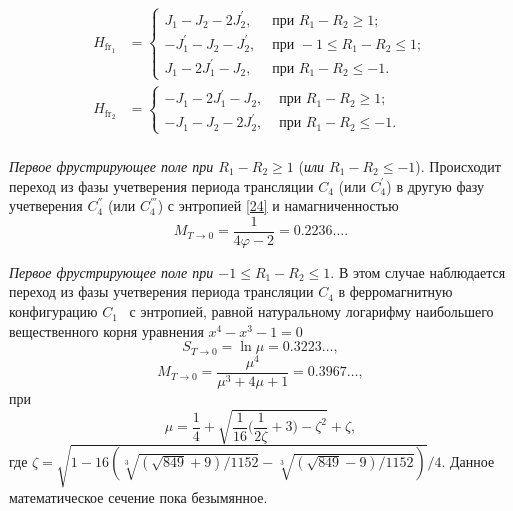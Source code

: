 \[
\begin{aligned}
H_{\text{fr}_1}&=
\begin{cases}
J_{1}-J_2-2J_{2}^{'}, & \text{ при } R_1-R_2\ge 1; \\
-J_{1}^{'}-J_2-J_{2}^{'}, & \text{ при } -1\leq R_1-R_2\leq 1; \\
J_1-2J_{1}^{'}-J_{2},   & \text{ при }  R_1-R_2\leq  -1.
\end{cases}\\
H_{\text{fr}_2}&=
\begin{cases}
-J_1-2J_1^{'}-J_2, & \text{ при } R_1-R_2\ge 1; \\
-J_1-J_2-2J_2^{'},   & \text{ при }  R_1-R_2\leq -1.
\end{cases}\\
\end{aligned}
\]


\emph{Первое фрустрирующее поле при $R_1 - R_2 \geqslant 1$} (\emph{или $R_1 - R_2 \leqslant -1$}). Происходит переход из фазы учетверения периода трансляции $C_4$ (или $C_4^{'}$) в другую фазу учетверения $C_4^{''}$ (или $C_4^{'''}$) с энтропией \eqref{24} и намагниченностью
\begin{equation}
M_{T\rightarrow 0} = \frac{1}{4\varphi - 2} = 0.2236\dots.
\label{34}
\end{equation}

\emph{Первое фрустрирующее поле при $-1 \leqslant R_1 - R_2 \leqslant 1$}. В этом случае наблюдается переход из фазы учетверения периода трансляции $C_4$ в ферромагнитную конфигурацию $C_1$~\cite{zarubin2019} с энтропией, равной натуральному логарифму наибольшего вещественного корня уравнения $x^4-x^3-1=0$
\begin{equation}
S_{T\rightarrow 0} = \ln \mu = 0.3223\dots,
\label{35}
\end{equation}
\begin{equation}
M_{T\rightarrow 0} = \frac{\mu^4}{\mu^3+4\mu+1} = 0.3967\dots,
\label{36}
\end{equation}
при 
\begin{equation*}
\mu = \frac{1}{4} + \sqrt{\frac{1}{16}\bigg(\frac{1}{2\zeta} + 3\bigg) - \zeta^2} + \zeta ,
\end{equation*}
где $\zeta = \sqrt{1-16\left(\sqrt[3]{(\sqrt{849}+9)/1152}-\sqrt[3]{(\sqrt{849}-9)/1152}\right)}/4$.
Данное математическое сечение пока безымянное.


